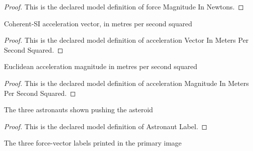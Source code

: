 \begin{proof}
  This is the declared model definition of force Magnitude In Newtons.
\end{proof}
\begin{definition}
  \label{def:physics:phyx-mini-0755:phyxminiproblems-problemphyxmini0755-accelerationvectorinmeterspersecondsquared}
  Coherent-SI acceleration vector, in metres per second squared
\end{definition}
\begin{proof}
  This is the declared model definition of acceleration Vector In Meters Per Second Squared.
\end{proof}
\begin{definition}
  \label{def:physics:phyx-mini-0755:phyxminiproblems-problemphyxmini0755-accelerationmagnitudeinmeterspersecondsquared}
  Euclidean acceleration magnitude in metres per second squared
\end{definition}
\begin{proof}
  This is the declared model definition of acceleration Magnitude In Meters Per Second Squared.
\end{proof}
\begin{definition}
  \label{def:physics:phyx-mini-0755:phyxminiproblems-problemphyxmini0755-astronautlabel}
  The three astronauts shown pushing the asteroid
\end{definition}
\begin{proof}
  This is the declared model definition of Astronaut Label.
\end{proof}
\begin{definition}
  \label{def:physics:phyx-mini-0755:phyxminiproblems-problemphyxmini0755-appliedforcelabel}
  The three force-vector labels printed in the primary image
\end{definition}
